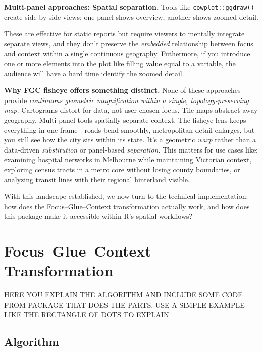 \textbf{Multi-panel approaches: Spatial separation.} Tools like \texttt{cowplot::ggdraw()}\citep{cowplot} create side-by-side views: one panel shows overview, another shows zoomed detail.


These are effective for static reports but require viewers to mentally integrate separate views, and they don't preserve the \emph{embedded} relationship between focus and context within a single continuous geography. Futhermore, if you introduce one or more elements into the plot like filling value equal to a variable, the audience will have a hard time identify the zoomed detail.

\textbf{Why FGC fisheye offers something distinct.} None of these approaches provide \emph{continuous geometric magnification within a single, topology-preserving map}. Cartograms distort for data, not user-chosen focus. Tile maps abstract away geography. Multi-panel tools spatially separate context. The fisheye lens keeps everything in one frame---roads bend smoothly, metropolitan detail enlarges, but you still see how the city sits within its state. It's a geometric \emph{warp} rather than a data-driven \emph{substitution} or panel-based \emph{separation}. This matters for use cases like: examining hospital networks in Melbourne while maintaining Victorian context, exploring census tracts in a metro core without losing county boundaries, or analyzing transit lines with their regional hinterland visible.

With this landscape established, we now turn to the technical implementation: how does the Focus--Glue--Context transformation actually work, and how does this package make it accessible within R's spatial workflows?

\section{Focus--Glue--Context Transformation}\label{focusgluecontext-transformation}

HERE YOU EXPLAIN THE ALGORITHM AND INCLUDE SOME CODE FROM PACKAGE THAT DOES THE PARTS. USE A SIMPLE EXAMPLE LIKE THE RECTANGLE OF DOTS TO EXPLAIN

\subsection{Algorithm}\label{algorithm}

